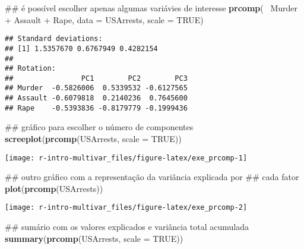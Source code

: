 \documentclass[]{book}
\newenvironment{Shaded}{\begin{snugshade}}{\end{snugshade}}
\newcommand{\KeywordTok}[1]{\textcolor[rgb]{0.13,0.29,0.53}{\textbf{{#1}}}}
\newcommand{\DataTypeTok}[1]{\textcolor[rgb]{0.13,0.29,0.53}{{#1}}}
\newcommand{\StringTok}[1]{\textcolor[rgb]{0.31,0.60,0.02}{{#1}}}
\newcommand{\OtherTok}[1]{\textcolor[rgb]{0.56,0.35,0.01}{{#1}}}
\newcommand{\NormalTok}[1]{{#1}}
\begin{document}
\begin{Shaded}
\begin{Highlighting}[]
\NormalTok{## é possível escolher apenas algumas variávies de interesse}
\KeywordTok{prcomp}\NormalTok{(~}\StringTok{ }\NormalTok{Murder +}\StringTok{ }\NormalTok{Assault +}\StringTok{ }\NormalTok{Rape, }\DataTypeTok{data =} \NormalTok{USArrests, }\DataTypeTok{scale =} \OtherTok{TRUE}\NormalTok{)}
\end{Highlighting}
\end{Shaded}

\begin{verbatim}
## Standard deviations:
## [1] 1.5357670 0.6767949 0.4282154
## 
## Rotation:
##                PC1        PC2        PC3
## Murder  -0.5826006  0.5339532 -0.6127565
## Assault -0.6079818  0.2140236  0.7645600
## Rape    -0.5393836 -0.8179779 -0.1999436
\end{verbatim}

\begin{Shaded}
\begin{Highlighting}[]
\NormalTok{## gráfico para escolher o número de componentes}
\KeywordTok{screeplot}\NormalTok{(}\KeywordTok{prcomp}\NormalTok{(USArrests, }\DataTypeTok{scale =} \OtherTok{TRUE}\NormalTok{))}
\end{Highlighting}
\end{Shaded}

\begin{center}\texttt{[image: r-intro-multivar\_files/figure-latex/exe\_prcomp-1]} \end{center}

\begin{Shaded}
\begin{Highlighting}[]
\NormalTok{## outro gráfico com a representação da variância explicada por }
\NormalTok{## cada fator}
\KeywordTok{plot}\NormalTok{(}\KeywordTok{prcomp}\NormalTok{(USArrests))}
\end{Highlighting}
\end{Shaded}

\begin{center}\texttt{[image: r-intro-multivar\_files/figure-latex/exe\_prcomp-2]} \end{center}

\begin{Shaded}
\begin{Highlighting}[]
\NormalTok{## sumário com os valores explicados e variância total acumulada}
\KeywordTok{summary}\NormalTok{(}\KeywordTok{prcomp}\NormalTok{(USArrests, }\DataTypeTok{scale =} \OtherTok{TRUE}\NormalTok{))}
\end{Highlighting}
\end{Shaded}
\end{document}
